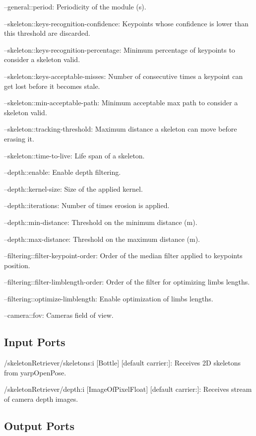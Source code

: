 \begin{DoxyItemize}
\item --general\+::period\+: Periodicity of the module (s).
\item --skeleton\+::keys-\/recognition-\/confidence\+: Keypoints whose confidence is lower than this threshold are discarded.
\item --skeleton\+::keys-\/recognition-\/percentage\+: Minimum percentage of keypoints to consider a skeleton valid.
\item --skeleton\+::keys-\/acceptable-\/misses\+: Number of consecutive times a keypoint can get lost before it becomes stale.
\item --skeleton\+::min-\/acceptable-\/path\+: Minimum acceptable max path to consider a skeleton valid.
\item --skeleton\+::tracking-\/threshold\+: Maximum distance a skeleton can move before erasing it.
\item --skeleton\+::time-\/to-\/live\+: Life span of a skeleton.
\item --depth\+::enable\+: Enable depth filtering.
\item --depth\+::kernel-\/size\+: Size of the applied kernel.
\item --depth\+::iterations\+: Number of times erosion is applied.
\item --depth\+::min-\/distance\+: Threshold on the minimum distance (m).
\item --depth\+::max-\/distance\+: Threshold on the maximum distance (m).
\item --filtering\+::filter-\/keypoint-\/order\+: Order of the median filter applied to keypoints\textquotesingle{} position.
\item --filtering\+::filter-\/limblength-\/order\+: Order of the filter for optimizing limbs\textquotesingle{} lengths.
\item --filtering\+::optimize-\/limblength\+: Enable optimization of limbs\textquotesingle{} lengths.
\item --camera\+::fov\+: Camera\textquotesingle{}s field of view. 
\end{DoxyItemize}\hypertarget{group__skeletonViewer_inputports_sec}{}\subsection{Input Ports}\label{group__skeletonViewer_inputports_sec}

\begin{DoxyItemize}
\item /skeleton\+Retriever/skeletons\+:i \mbox{[}Bottle\mbox{]} \mbox{[}default carrier\+:\mbox{]}\+: Receives 2D skeletons from yarp\+Open\+Pose.
\item /skeleton\+Retriever/depth\+:i \mbox{[}Image\+Of\+Pixel\+Float\mbox{]} \mbox{[}default carrier\+:\mbox{]}\+: Receives stream of camera depth images.
\end{DoxyItemize}\hypertarget{group__skeletonViewer_outputports_sec}{}\subsection{Output Ports}\label{group__skeletonViewer_outputports_sec}

